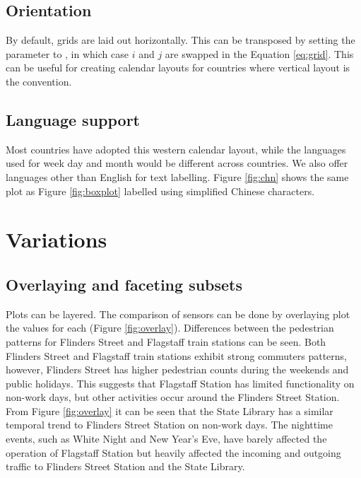 \documentclass[article]{jss}
\theoremstyle{definition}
\theoremstyle{definition}
\theoremstyle{definition}
\theoremstyle{remark}
\begin{document}
\subsection{Orientation}\label{orientation}

By default, grids are laid out horizontally. This can be transposed by
setting the  parameter to , in which case \(i\) and
\(j\) are swapped in the Equation \ref{eq:grid}. This can be useful for
creating calendar layouts for countries where vertical layout is the
convention.

\subsection{Language support}\label{language-support}

Most countries have adopted this western calendar layout, while the
languages used for week day and month would be different across
countries. We also offer languages other than English for text
labelling. Figure \ref{fig:chn} shows the same plot as Figure
\ref{fig:boxplot} labelled using simplified Chinese characters.

\section{Variations}\label{variations}

\label{sec:examples}

\subsection{Overlaying and faceting
subsets}\label{overlaying-and-faceting-subsets}

Plots can be layered. The comparison of sensors can be done by
overlaying plot the values for each (Figure \ref{fig:overlay}).
Differences between the pedestrian patterns for Flinders Street and
Flagstaff train stations can be seen. Both Flinders Street and Flagstaff
train stations exhibit strong commuters patterns, however, Flinders
Street has higher pedestrian counts during the weekends and public
holidays. This suggests that Flagstaff Station has limited functionality
on non-work days, but other activities occur around the Flinders Street
Station. From Figure \ref{fig:overlay} it can be seen that the State
Library has a similar temporal trend to Flinders Street Station on
non-work days. The nighttime events, such as White Night and New Year's
Eve, have barely affected the operation of Flagstaff Station but heavily
affected the incoming and outgoing traffic to Flinders Street Station
and the State Library.
\end{document}
